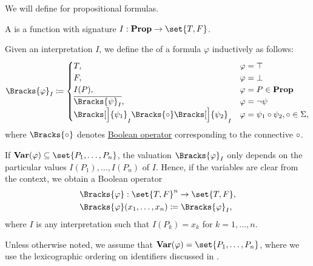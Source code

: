 \begin{definition}\label{def:propositional_valuation}
  We will define  for propositional formulas.

  \begin{thmenum}
     A  is a function with signature \( I: \boldop{Prop} \to \set{ T, F } \).

     Given an interpretation \( I \), we define the  of a formula \( \varphi \) inductively as follows:
    \begin{equation}\label{eq:def:propositional_valuation/formula_interpretation}
      \Bracks{\varphi}_I \coloneqq \begin{cases}
        T,                                                                &\varphi = \top \\
        F,                                                                &\varphi = \bot \\
        I(P),                                                             &\varphi = P \in \boldop{Prop} \\
        \overline{\Bracks{\psi}_I},                                       &\varphi = \neg \psi \\
        \Bracks[\Big]{\psi_1}_I \Bracks{\bincirc} \Bracks[\Big]{\psi_2}_I &\varphi = \psi_1 \bincirc \psi_2, \bincirc \in \Sigma,
      \end{cases}
    \end{equation}
    where \( \Bracks{\bincirc} \) denotes \hyperref[def:standard_boolean_operators]{Boolean operator} corresponding to the connective \( \bincirc \).

     If \( \boldop{Var}(\varphi) \subseteq \set{ P_1, \ldots, P_n } \), the valuation \( \Bracks{\varphi}_I \) only depends on the particular values \( I(P_1), \ldots, I(P_n) \) of \( I \). Hence, if the variables are clear from the context, we obtain a Boolean operator
    \begin{equation*}
      \begin{aligned}
        &\Bracks{\varphi}: \set{ T, F }^n \to \set{ T, F }, \\
        &\Bracks{\varphi}(x_1, \ldots, x_n) \coloneqq \Bracks{\varphi}_I,
      \end{aligned}
    \end{equation*}
    where \( I \) is any interpretation such that \( I(P_k) = x_k \) for \( k = 1, \ldots, n \).

    Unless otherwise noted, we assume that \( \boldop{Var}(\varphi) = \set{ P_1, \ldots, P_n } \), where we use the lexicographic ordering on identifiers discussed in .
  \end{thmenum}
\end{definition}
